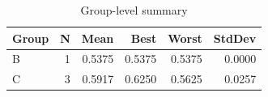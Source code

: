 \begin{table}[htbp]
\centering
\caption{Group-level summary}
\label{tab:group-summary}
\begin{tabular}{lrrrrr}
\toprule
\textbf{Group} & \textbf{N} & \textbf{Mean} & \textbf{Best} & \textbf{Worst} & \textbf{StdDev} \\
\midrule
B & 1 & 0.5375 & 0.5375 & 0.5375 & 0.0000 \\
C & 3 & 0.5917 & 0.6250 & 0.5625 & 0.0257 \\
\bottomrule
\end{tabular}
\end{table}